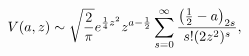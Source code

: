 \[\mathop{V\/}\nolimits\!\left(a,z\right)\sim\sqrt{\frac{2}{\pi}}e^{\frac{1}{4}z%
^{2}}z^{a-\frac{1}{2}}\sum_{s=0}^{\infty}\frac{\left(\frac{1}{2}-a\right)_{2s}%
}{s!(2z^{2})^{s}},\]